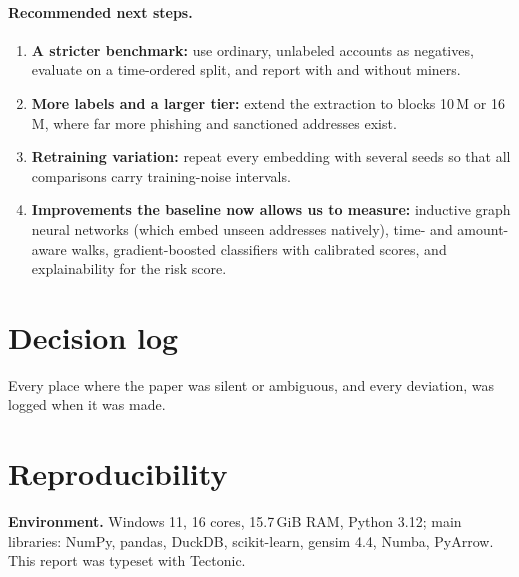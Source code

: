 \documentclass[11pt,a4paper]{article}
\begin{document}
\paragraph{Recommended next steps.}
\begin{enumerate}
\item \textbf{A stricter benchmark:} use ordinary, unlabeled accounts as negatives, evaluate on a time-ordered split, and report with and without miners.
\item \textbf{More labels and a larger tier:} extend the extraction to blocks 10\,M or 16\,M, where far more phishing and sanctioned addresses exist.
\item \textbf{Retraining variation:} repeat every embedding with several seeds so that all comparisons carry training-noise intervals.
\item \textbf{Improvements the baseline now allows us to measure:} inductive graph neural networks (which embed unseen addresses natively), time- and amount-aware walks, gradient-boosted classifiers with calibrated scores, and explainability for the risk score.
\end{enumerate}

\appendix
\section{Decision log}
\label{app:decisions}
Every place where the paper was silent or ambiguous, and every deviation, was logged when it was made.
{\footnotesize

}

\section{Reproducibility}
\label{app:repro}
\textbf{Environment.} Windows 11, 16 cores, 15.7\,GiB RAM, Python 3.12; main libraries: NumPy, pandas, DuckDB, scikit-learn, gensim 4.4, Numba, PyArrow. This report was typeset with Tectonic.
\end{document}
